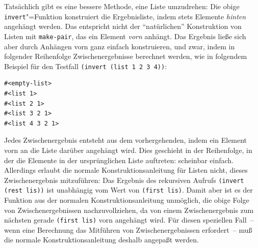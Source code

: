 Tatsächlich gibt es eine bessere Methode, eine Liste umzudrehen: Die
obige \texttt{invert}"=Funktion konstruiert die Ergebnisliste, indem
stets Elemente \emph{hinten} angehängt werden.  Das entspricht 
nicht der "`natürlichen"' Konstruktion von Listen mit
\texttt{make-pair}, das ein Element \emph{vorn} anhängt.  
Das Ergebnis ließe sich aber durch Anhängen vorn ganz einfach
konstruieren, und zwar, indem in folgender Reihenfolge
Zwischenergebnisse berechnet werden, wie in folgendem Beispiel für den
Testfall \texttt{(invert (list 1 2 3 4))}:
%
\begin{verbatim}
#<empty-list>
#<list 1>
#<list 2 1>
#<list 3 2 1>
#<list 4 3 2 1>
\end{verbatim}
%
Jedes Zwischenergebnis entsteht aus dem vorhergehenden, indem ein
Element vorn an die Liste darüber angehängt wird.  Dies geschieht in
der Reihenfolge, in der die Elemente in der ursprünglichen Liste
auftreten: scheinbar einfach.  Allerdings erlaubt die normale
Konstruktionsanleitung für Listen nicht, dieses Zwischenergebnis
mitzuführen: Das Ergebnis des rekursiven Aufrufs \texttt{(invert (rest
  lis))} ist unabhängig vom Wert von \texttt{(first lis)}.  Damit aber
ist es der Funktion aus der normalen Konstruktionsanleitung unmöglich,
die obige Folge von Zwischenergebnissen nachzuvollziehen, da von einem
Zwischenergebnis zum nächsten gerade \texttt{(first lis)} vorn
angehängt wird.  Für diesen speziellen Fall~-- wenn eine Berechnung das
Mitführen von Zwischenergebnissen erfordert~-- muß die normale
Konstruktionsanleitung deshalb angepaßt werden.

